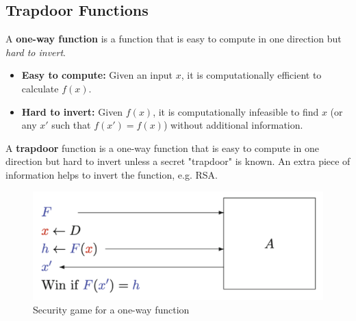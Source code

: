 \newpage

\subsection{Trapdoor Functions}

\begin{defn}
    A \textbf{one-way function} is a function that is easy to compute in one direction but \emph{hard to invert}.

\begin{itemize}
    \item \textbf{Easy to compute:} Given an input \( x \), it is computationally efficient to calculate \( f(x) \).
    \item \textbf{Hard to invert:} Given \( f(x) \), it is computationally infeasible to find \( x \) (or any \( x' \) such that \( f(x') = f(x) \)) without additional information.
\end{itemize}
\end{defn}

\begin{defn}
    A \textbf{trapdoor} function is a one-way function that is easy to compute in one direction but hard to invert unless a secret "trapdoor" is known. An extra piece of information helps to invert the function, e.g. RSA.
\end{defn}

\begin{figure}[h!]
    \centering
    \includegraphics[scale=0.5]{img/OWgame.png}
    \caption{Security game for a one-way function}
    \label{trapdoor}
\end{figure}

